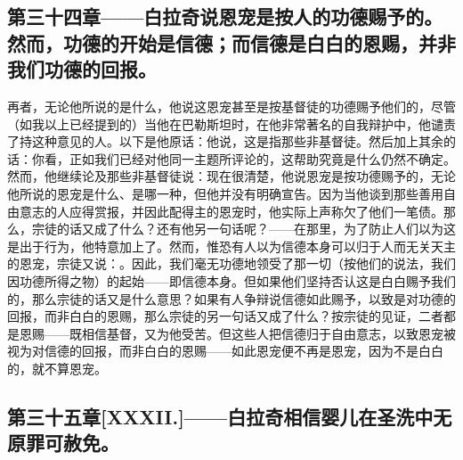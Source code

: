 
\subsection{第三十四章——白拉奇说恩宠是按人的功德赐予的。然而，功德的开始是信德；而信德是白白的恩赐，并非我们功德的回报。}

再者，无论他所说的是什么，他说这恩宠甚至是按基督徒的功德赐予他们的，尽管（如我以上已经提到的）当他在巴勒斯坦时，在他非常著名的自我辩护中，他谴责了持这种意见的人。以下是他原话：他说，这是指那些非基督徒。然后加上其余的话：你看，正如我们已经对他同一主题所评论的，这帮助究竟是什么仍然不确定。然而，他继续论及那些非基督徒说：现在很清楚，他说恩宠是按功德赐予的，无论他所说的恩宠是什么、是哪一种，但他并没有明确宣告。因为当他谈到那些善用自由意志的人应得赏报，并因此配得主的恩宠时，他实际上声称欠了他们一笔债。那么，宗徒的话又成了什么？还有他另一句话呢？——在那里，为了防止人们以为这是出于行为，他特意加上了。然而，惟恐有人以为信德本身可以归于人而无关天主的恩宠，宗徒又说：。因此，我们毫无功德地领受了那一切（按他们的说法，我们因功德所得之物）的起始——即信德本身。但如果他们坚持否认这是白白赐予我们的，那么宗徒的话又是什么意思？如果有人争辩说信德如此赐予，以致是对功德的回报，而非白白的恩赐，那么宗徒的另一句话又成了什么？按宗徒的见证，二者都是恩赐——既相信基督，又为他受苦。但这些人把信德归于自由意志，以致恩宠被视为对信德的回报，而非白白的恩赐——如此恩宠便不再是恩宠，因为不是白白的，就不算恩宠。\par


\subsection{第三十五章[XXXII.]——白拉奇相信婴儿在圣洗中无原罪可赦免。}

